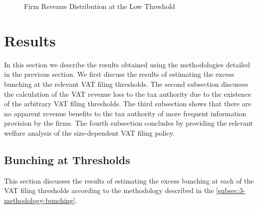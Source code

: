 \begin{figure}[t!]
{    \label{fig:LowestThreshold-D}
  }
  \hspace{0mm}
  \caption{Firm Revenue Distribution at the Low Threshold}
  \label{fig:LowestThreshold}
\end{figure}


\section{Results}
\label{sec:3-results}
In this section we describe the results obtained using the methodologies detailed in the previous section. We first discuss the results of estimating the excess bunching at the relevant VAT filing thresholds. The second subsection discusses the calculation of the VAT revenue loss to the tax authority due to the existence of the arbitrary VAT filing thresholds. The third subsection shows that there are no apparent revenue benefits to the tax authority of more frequent information provision by the firms. The fourth subsection concludes by providing the relevant welfare analysis of the size-dependent VAT filing policy.

\subsection{Bunching at Thresholds}
\label{subsec:3-results-bunching}
This section discusses the results of estimating the excess bunching at each of the VAT filing thresholds according to the methodology described in the \cref{subsec:3-methodology-bunching}.

